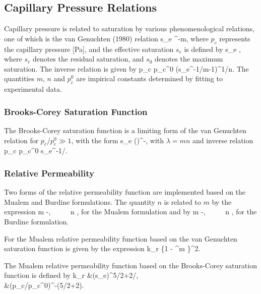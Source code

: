 \subsection{Capillary Pressure Relations}

Capillary pressure is related to saturation by various 
phenomenological relations, one of which is the van Genuchten 
(1980) relation 
\EQ\label{seff}
s_e \eq {}^{-m}, 
\EN 
where $p_c$ represents the capillary pressure [Pa], and the effective saturation $s_e$ is defined by 
\EQ 
s_e \eq {}, 
\EN 
where $s_r$ denotes the residual saturation, and $s_0$ denotes 
the maximum saturation. 
The inverse relation is given by
\EQ
p_c \eq p_c^0 \left(s_e^{-1/m}-1\right)^{1/n}.
\EN
The quantities $m$, $n$ and $p_c^0$ are impirical constants determined by fitting to experimental data.

\subsubsection{Brooks-Corey Saturation Function} 

The Brooks-Corey saturation function is a limiting form of the van Genuchten relation for $p_c/p_c^0 \gg 1$, with the form
\EQ
s_e \eq \left(\right)^{-\lambda},
\EN
with $\lambda=mn$ and inverse relation
\EQ
p_c \eq p_c^0 s_e^{-1/\lambda}.
\EN

\subsubsection{Relative Permeability}

Two forms of the relative permeability function are implemented based on the Mualem and Burdine formulations.
The quantity $n$ is related to $m$ by 
the expression 
\EQ\label{lambda_mualem} 
m -, \ \ \ \ \ n \eq {}, 
\EN 
for the Mualem formulation and by
\EQ\label{lambda_burdine} 
m -, \ \ \ \ \ n \eq {}, 
\EN 
for the Burdine formulation.

For the Mualem relative permeability function based on the van Genuchten saturation function is given by the expression 
\EQ\label{krl_mualem} 
k_{r} \eq {} \left\{1 - ^m \right\}^2. 
\EN 

The Mualem relative permeability function based on the Brooks-Corey saturation function is defined by 
\BA
k_r &\eq \big(s_e\big)^{5/2+2/\lambda},\\
&\eq \big(p_c/p_c^0\big)^{-(5\lambda/2+2)}.
\EA


